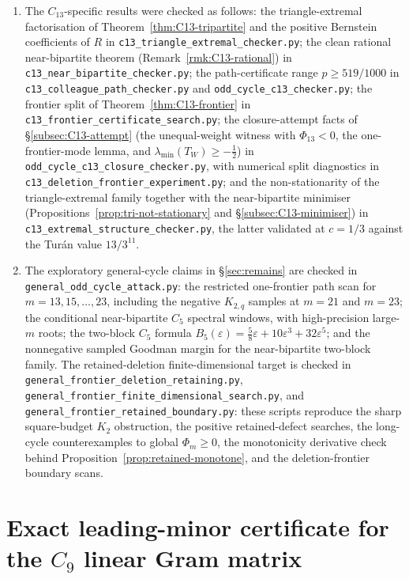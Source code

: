 \documentclass[11pt]{article}
\newcommand{\eps}{\varepsilon}
\begin{document}
\begin{enumerate}[label=\textup{(\arabic*)}]
    \item The $C_{13}$-specific results were checked as follows: the triangle-extremal factorisation of Theorem~\ref{thm:C13-tripartite} and the positive Bernstein coefficients of $R$ in \texttt{c13\_triangle\_extremal\_checker.py}; the clean rational near-bipartite theorem (Remark~\ref{rmk:C13-rational}) in \texttt{c13\_near\_bipartite\_checker.py}; the path-certificate range $p\ge519/1000$ in \texttt{c13\_colleague\_path\_checker.py} and \texttt{odd\_cycle\_c13\_checker.py}; the frontier split of Theorem~\ref{thm:C13-frontier} in \texttt{c13\_frontier\_\allowbreak certificate\_\allowbreak search.py}; the closure-attempt facts of \S\ref{subsec:C13-attempt} (the unequal-weight witness with $\Phi_{13}<0$, the one-frontier-mode lemma, and $\lambda_{\min}(T_W)\ge-\tfrac12$) in \texttt{odd\_cycle\_c13\_closure\_checker.py}, with numerical split diagnostics in \texttt{c13\_deletion\_\allowbreak frontier\_\allowbreak experiment.py}; and the non-stationarity of the triangle-extremal family together with the near-bipartite minimiser (Propositions~\ref{prop:tri-not-stationary} and \S\ref{subsec:C13-minimiser}) in \texttt{c13\_extremal\_structure\_checker.py}, the latter validated at $c=1/3$ against the Tur\'an value $13/3^{11}$.
    \item The exploratory general-cycle claims in \S\ref{sec:remains} are checked in \texttt{general\_odd\_cycle\_attack.py}: the restricted one-frontier path scan for $m=13,15,\ldots,23$, including the negative $K_{2,q}$ samples at $m=21$ and $m=23$; the conditional near-bipartite $C_5$ spectral windows, with high-precision large-$m$ roots; the two-block $C_5$ formula $B_5(\eps)=\frac58\eps+10\eps^3+32\eps^5$; and the nonnegative sampled Goodman margin for the near-bipartite two-block family.  The retained-deletion finite-dimensional target is checked in \texttt{general\_frontier\_\allowbreak deletion\_\allowbreak retaining.py}, \texttt{general\_frontier\_\allowbreak finite\_\allowbreak dimensional\_\allowbreak search.py}, and \texttt{general\_frontier\_\allowbreak retained\_\allowbreak boundary.py}: these scripts reproduce the sharp square-budget $K_2$ obstruction, the positive retained-defect searches, the long-cycle counterexamples to global $\Phi_m\ge0$, the monotonicity derivative check behind Proposition~\ref{prop:retained-monotone}, and the deletion-frontier boundary scans.
\end{enumerate}

\appendix

\section{Exact leading-minor certificate for the $C_9$ linear Gram matrix}\label{app:C9-minors}
\end{document}
